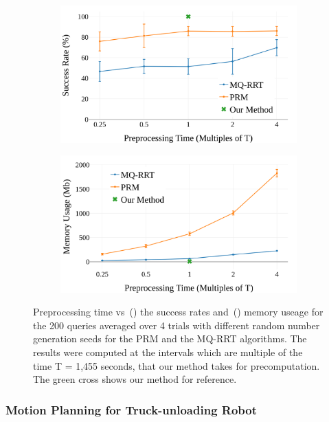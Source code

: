 \documentclass[a4paper,10pt]{article}
\begin{document}
\begin{figure}
\begin{subfigure}{0.5\textwidth}
\centering
  \includegraphics[width=0.9\linewidth]{success.png}
  \caption{}
  \label{fig:success}
\end{subfigure}
\hfill
\begin{subfigure}{0.5\textwidth}
\centering
  \includegraphics[width=0.9\linewidth]{memory.png}
  \caption{}
  \label{fig:memory}
\end{subfigure}
    \caption{Preprocessing time vs~() the success rates and~() memory useage for the 200 queries averaged over 4 trials with different random number generation seeds for the PRM and the MQ-RRT algorithms. The results were computed at the intervals which are multiple of the time T = 1,455 seconds, that our method takes for precomputation. The green cross shows our method for reference.}
    \label{fig:plots}
\end{figure}

\subsubsection{Motion Planning for Truck-unloading Robot}
\end{document}
